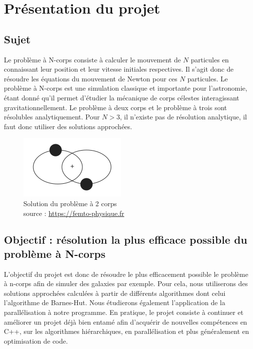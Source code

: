 \chapter{Présentation du projet}
\section{Sujet}
Le problème à N-corps consiste à calculer le mouvement de  $N$ particules en connaissant leur position et leur vitesse initiales respectives.
Il s'agit donc de résoudre les équations du mouvement de Newton pour ces $N$ particules.
Le problème à N-corps est une simulation classique et importante pour l'astronomie, étant donné qu'il permet d'étudier la mécanique de corps célestes interagissant gravitationnellement.
Le problème à deux corps et le problème à trois sont  résolubles analytiquement. Pour $N>3$, il n'existe pas de résolution analytique, il faut donc utiliser des solutions approchées.

\begin{figure}[!h]
\begin{center}
\includegraphics[scale=0.8]{presentation/two.png}
\captionsetup{hypcap=false}
\caption{Solution du problème à 2 corps \\
source : \url{https://femto-physique.fr}}
\label{fig1}
\end{center}
\end{figure}

\section{Objectif : résolution la plus efficace possible du problème à N-corps}

L'objectif du projet est donc de résoudre le plus efficacement possible le problème à n-corps afin de simuler des galaxies par exemple.
Pour cela, nous utiliserons des solutions approchées calculées à partir de différents algorithmes dont celui l'algorithme de Barnes-Hut. Nous étudierons également l'application de la parallélisation à notre programme.
En pratique, le projet consiste à continuer et améliorer un projet déjà bien entamé afin d'acquérir de nouvelles compétences en C++, sur les algorithmes hiérarchiques, en parallélisation et plus généralement en optimisation de code.

